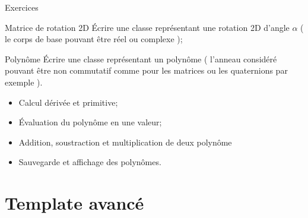 \documentclass[handout,10pt]{beamer}
\begin{document}
\begin{frame}[fragile]{Exercices}
\tiny
\begin{exampleblock}{Matrice de rotation 2D}
\'Ecrire une classe représentant une rotation 2D d'angle $\alpha$ ( le corps de base pouvant être réel ou complexe );
\end{exampleblock}

\begin{exampleblock}{Polynôme}
Écrire une classe représentant un polynôme ( l'anneau considéré pouvant être non commutatif comme pour les matrices ou les quaternions par exemple ).
\begin{itemize}
\item Calcul dérivée et primitive;
\item Évaluation du polynôme en une valeur;
\item Addition, soustraction et multiplication de deux polynôme
\item Sauvegarde et affichage des polynômes.
\end{itemize}
\end{exampleblock}
\end{frame}

\section{Template avancé}
\end{document}
